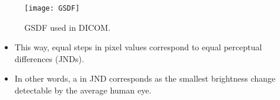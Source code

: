 \begin{figure}[H]
  \vspace{-0ex}
  \centering
  \texttt{[image: GSDF]}
  \caption{\gls{GSDF} used in \gls{DICOM}.}
  \label{fig:GSDF}
\end{figure}

\begin{itemize}
\item This way, equal steps in pixel values correspond to equal
  perceptual differences (\glspl{JND}).
\item In other words, a  in \gls{JND} corresponds as the smallest
  brightness change detectable by the average human eye.
\end{itemize}
